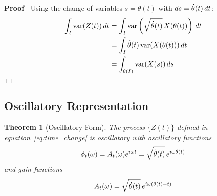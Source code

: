 \documentclass{article}
\newenvironment{proof}{\noindent\textbf{Proof\ }}{\hspace*{\fill}$\Box$\medskip}
\newtheorem{theorem}{Theorem}
\begin{document}
\begin{proof}
Using the change of variables $s = \theta (t)$ with $ds = \dot{\theta} (t)
\hspace{0.17em} dt$:
\begin{align}
\int_I \mathrm{var} (Z (t)) \hspace{0.17em} dt & = \int_I \mathrm{var}
\left( \sqrt{\dot{\theta} (t)} \hspace{0.17em} X (\theta (t)) \right)
\hspace{0.17em} dt \\
& = \int_I \dot{\theta} (t) \hspace{0.17em} \mathrm{var} (X (\theta (t)))
\hspace{0.17em} dt \\
& = \int_{\theta (I)} \mathrm{var} (X (s)) \hspace{0.17em} ds
\end{align}
\end{proof}

\subsection{Oscillatory Representation}

\begin{theorem}
[Oscillatory Form]\label{thm:osc_rep} The process $\{ Z (t) \}$ defined in
equation~\eqref{eq:time_change} is oscillatory with oscillatory functions
\begin{equation}
\label{eq:phi_def} \phi_t (\omega) = A_t (\omega) e^{i \omega t} =
\sqrt{\dot{\theta} (t)} \hspace{0.17em} e^{i \omega \theta (t)}
\end{equation}
and gain functions 
\begin{equation}
A_t (\omega) = \sqrt{\dot{\theta} (t)} \hspace{0.17em} e^{i \omega
(\theta (t) - t)}
\end{equation}
\end{theorem}
\end{document}
